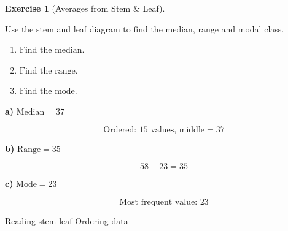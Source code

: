 \documentclass[
  letterpaper,
  DIV=11,
  numbers=noendperiod]{scrreprt}
\theoremstyle{definition}
\newtheorem{exercise}{Exercise}[chapter]
\theoremstyle{remark}
\begin{document}
\begin{exercise}[Averages from Stem \&
Leaf]\protect\hypertarget{exr-avg-2}{}\label{exr-avg-2}

Use the stem and leaf diagram to find the median, range and modal class.

\begin{enumerate}
\def\labelenumi{\alph{enumi})}
\item
  \(\text{Find the median.}\)
\item
  \(\text{Find the range.}\)
\item
  \(\text{Find the mode.}\)
\end{enumerate}

\begin{tcolorbox}[enhanced jigsaw, opacitybacktitle=0.6, coltitle=black, arc=.35mm, colframe=quarto-callout-tip-color-frame, colback=white, bottomrule=.15mm, left=2mm, colbacktitle=quarto-callout-tip-color!10!white, titlerule=0mm, opacityback=0, title=\textcolor{quarto-callout-tip-color}{\faLightbulb}\hspace{0.5em}{🔍 View Solution}, leftrule=.75mm, breakable, rightrule=.15mm, bottomtitle=1mm, toptitle=1mm, toprule=.15mm]

\textbf{a)} \(\text{Median} = 37\)

\[\quad \text{Ordered: }15\text{ values, middle} = 37\]

\textbf{b)} \(\text{Range} = 35\)

\[\quad 58 - 23 = 35\]

\textbf{c)} \(\text{Mode} = 23\)

\[\quad \text{Most frequent value: }23\]

\end{tcolorbox}

{Reading stem leaf} {Ordering data}

\end{exercise}
\end{document}
